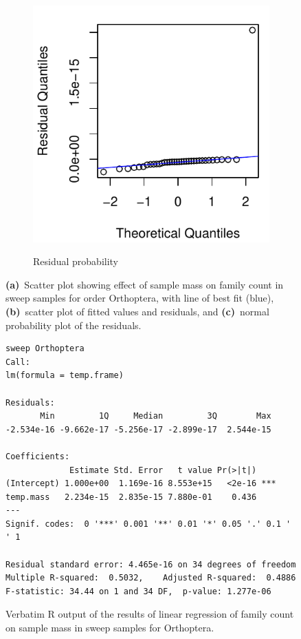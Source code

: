 \documentclass[10pt,letterpaper,twocolumn]{article}
\begin{document}
\begin{figure}[h]
\begin{subfigure}[b]{0.15\textwidth}
		\label{fig:sweep_orthoptera_resid}
	\end{subfigure}
	~
	\begin{subfigure}[b]{0.15\textwidth}
		\caption{Residual probability}
		\includegraphics[width=\textwidth]{plots/mass-vs-count/qqplot/2015_sweep_Orthoptera_qqplot.pdf}
		\label{fig:sweep_orthoptera_qqplot}
	\end{subfigure}
	\caption{\textbf{(a)}~Scatter plot showing effect of sample mass on family count in sweep samples for order Orthoptera, with line of best fit (blue), \textbf{(b)}~scatter plot of fitted values and residuals, and \textbf{(c)}~normal probability plot of the residuals.}
	\label{fig:sweep_orthoptera}
	\smallskip
	\nointerlineskip
	\hrulefill
\end{figure}

\begin{figure}[h]
	\lstset{numbers=left}
	\lstset{xleftmargin=5mm,framexleftmargin=5mm}
	\begin{lstlisting}
sweep Orthoptera
Call:
lm(formula = temp.frame)

Residuals:
       Min         1Q     Median         3Q        Max 
-2.534e-16 -9.662e-17 -5.256e-17 -2.899e-17  2.544e-15 

Coefficients:
             Estimate Std. Error   t value Pr(>|t|)    
(Intercept) 1.000e+00  1.169e-16 8.553e+15   <2e-16 ***
temp.mass   2.234e-15  2.835e-15 7.880e-01    0.436    
---
Signif. codes:  0 '***' 0.001 '**' 0.01 '*' 0.05 '.' 0.1 ' ' 1

Residual standard error: 4.465e-16 on 34 degrees of freedom
Multiple R-squared:  0.5032,	Adjusted R-squared:  0.4886 
F-statistic: 34.44 on 1 and 34 DF,  p-value: 1.277e-06
	\end{lstlisting}
	\caption{Verbatim R output of the results of linear regression of family count on sample mass in sweep samples for Orthoptera.}
	\label{fig:sweep_orthoptera_regression}
	\smallskip
	\nointerlineskip
	\hrulefill
\end{figure}
\end{document}
